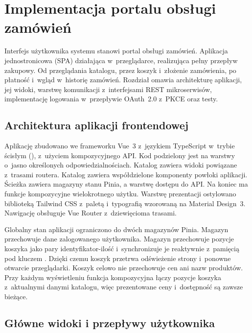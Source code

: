 \chapter{Implementacja portalu obsługi zamówień}
\label{chap:implementacja-portalu}

Interfejs użytkownika systemu stanowi portal obsługi zamówień. Aplikacja jednostronicowa (SPA) działająca
w~przeglądarce, realizująca pełny przepływ zakupowy. Od przeglądania katalogu, przez koszyk i~złożenie zamówienia,
po płatność i~wgląd w~historię zamówień. Rozdział omawia architekturę aplikacji, jej widoki, warstwę komunikacji
z~interfejsami REST mikroserwisów, implementację logowania w~przepływie OAuth~2.0 z~PKCE oraz testy.

\section{Architektura aplikacji frontendowej}
\label{sec:architektura-frontendu}

Aplikację zbudowano we frameworku Vue~3 z~językiem TypeScript w~trybie ścisłym (), z~użyciem
kompozycyjnego API. Kod podzielony jest na warstwy o~jasno określonych odpowiedzialnościach. Katalog
 zawiera widoki powiązane z~trasami routera. Katalog  zawiera współdzielone komponenty powłoki
aplikacji. Ścieżka  zawiera magazyny stanu Pinia, a  warstwę dostępu do API.
Na koniec  ma funkcje kompozycyjne wielokrotnego użytku. Warstwę
prezentacji ostylowano biblioteką Tailwind CSS z~paletą i~typografią wzorowaną na Material Design~3.
Nawigację obsługuje Vue Router z~dziewięcioma trasami. 

Globalny stan aplikacji ograniczono do dwóch magazynów Pinia. Magazyn  przechowuje dane zalogowanego
użytkownika. Magazyn  przechowuje pozycje koszyka jako pary identyfikator-ilość i~synchronizuje je reaktywnie
z~pamięcią  pod kluczem . Dzięki czemu koszyk przetrwa odświeżenie strony
i~ponowne otwarcie przeglądarki. Koszyk celowo nie przechowuje cen ani nazw produktów. Przy każdym wyświetleniu
funkcja kompozycyjna  łączy pozycje koszyka z~aktualnymi danymi katalogu, więc prezentowane
ceny i~dostępność są zawsze bieżące.

\section{Główne widoki i przepływy użytkownika}
\label{sec:widoki-i-przeplywy}

